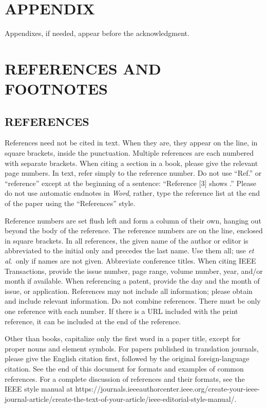 \documentclass{ieeetj}
\begin{document}
\section*{APPENDIX}
Appendixes, if needed, appear before the acknowledgment.

\section*{REFERENCES AND FOOTNOTES}
\subsection{REFERENCES}
References need not be cited in text. When they are, they appear on the
line, in square brackets, inside the punctuation. Multiple references are
each numbered with separate brackets. When citing a section in a book,
please give the relevant page numbers. In text, refer simply to the
reference number. Do not use ``Ref.'' or ``reference'' except at the
beginning of a sentence: ``Reference [3] shows \textellipsis .'' Please do not use
automatic endnotes in \textit{Word}, rather, type the reference list at the end of the
paper using the ``References'' style.

Reference numbers are set flush left and form a column of their own, hanging
out beyond the body of the reference. The reference numbers are on the line,
enclosed in square brackets. In all references, the given name of the author
or editor is abbreviated to the initial only and precedes the last name. Use
them all; use \textit{et al}.\ only if names are not given.
Abbreviate conference titles. When citing IEEE Transactions,
provide the issue number, page range, volume number, year, and/or month if
available. When referencing a patent, provide the day and the month of
issue, or application. References may not include all information; please
obtain and include relevant information. Do not combine references. There
must be only one reference with each number. If there is a URL included with
the print reference, it can be included at the end of the reference.

Other than books, capitalize only the first word in a paper title, except
for proper nouns and element symbols. For papers published in translation
journals, please give the English citation first, followed by the original
foreign-language citation. See the end of this document for formats and
examples of common references. For a complete discussion of references and
their formats, see the IEEE style manual at 
https://\discretionary{}{}{}journals.ieeeauthorcenter.ieee.org/\discretionary{}{}{}create-your-ieee-journal-article/\discretionary{}{}{}create-the-text-of-your-article/\discretionary{}{}{}ieee-editorial-style-manual/.
\end{document}
